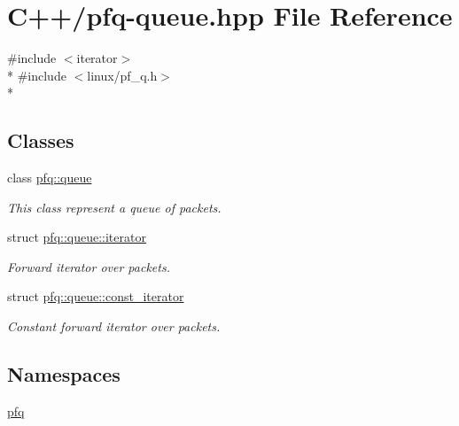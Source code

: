 \hypertarget{pfq-queue_8hpp}{\section{C++/pfq-\/queue.hpp File Reference}
\label{pfq-queue_8hpp}
}
{\ttfamily \#include $<$iterator$>$}\\*
{\ttfamily \#include $<$linux/pf\+\_\+q.\+h$>$}\\*
\subsection*{Classes}
\begin{DoxyCompactItemize}
\item 
class \hyperlink{classpfq_1_1queue}{pfq\+::queue}
\begin{DoxyCompactList}\small\item\em This class represent a queue of packets. \end{DoxyCompactList}\item 
struct \hyperlink{structpfq_1_1queue_1_1iterator}{pfq\+::queue\+::iterator}
\begin{DoxyCompactList}\small\item\em Forward iterator over packets. \end{DoxyCompactList}\item 
struct \hyperlink{structpfq_1_1queue_1_1const__iterator}{pfq\+::queue\+::const\+\_\+iterator}
\begin{DoxyCompactList}\small\item\em Constant forward iterator over packets. \end{DoxyCompactList}\end{DoxyCompactItemize}
\subsection*{Namespaces}
\begin{DoxyCompactItemize}
\item 
 \hyperlink{namespacepfq}{pfq}
\end{DoxyCompactItemize}
